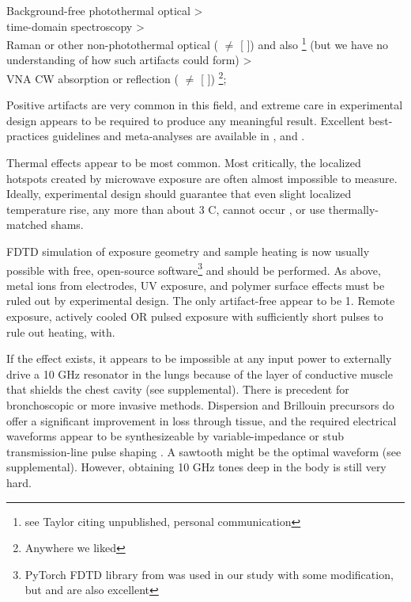 \documentclass[paper.tex]{subfiles}
\begin{document}
Background-free photothermal optical \cite{Microwave1993a}\cite{Broadband1988} >\\ time-domain spectroscopy\cite{Time2003}\cite{Dielectric2004}\cite{Microwave1994} >\\ Raman or other non-photothermal optical (\cite{optical1983} $\neq$ [\cite{Resonances1987} \cite{Dielectric1989}]) and also \footnote{see Taylor \cite{mechanisms1981} citing unpublished, personal communication} (but we have no understanding of how such artifacts could form) >\\ VNA CW absorption or reflection (\cite{Microwave1982} $\neq$ [\cite{Resonances1987} \cite{Dielectric1989}]) \cite{Substitution1982} \cite{Millimeter1980} \footnote{Anywhere we liked};

Positive artifacts are very common in this field, and extreme care in experimental design appears to be required to produce any meaningful result. Excellent best-practices guidelines and meta-analyses are available in \cite{Biological2016} \cite{Comprehensive2018} \cite{Funding2019}, \cite{chou1996radio} and \cite{Effects2016}.

Thermal effects appear to be most common. Most critically, the localized hotspots created by microwave exposure are often almost impossible to measure. Ideally, experimental design should guarantee that even slight localized temperature rise, any more than about 3 C, cannot occur \cite{Sharp1983}\cite{DNA2004}, or use thermally-matched shams\cite{Basic1983}. \cite{Effects1951}

FDTD simulation of exposure geometry and sample heating is now usually possible with free, open-source software\footnote{PyTorch FDTD library from \cite{Highly2019} was used in our study with some modification, but \cite{CUDAbased2019} and \cite{openEMS} are also excellent} and should be performed. As above, metal ions from electrodes, UV exposure, and polymer surface effects\cite{Effect1994a} must be ruled out by experimental design. The only artifact-free appear to be 1. Remote exposure, actively cooled OR pulsed exposure with sufficiently short pulses to rule out heating, with. 

If the effect exists, it appears to be impossible at any input power to externally drive a 10 GHz resonator in the lungs because of the layer of conductive muscle that shields the chest cavity (see supplemental). There is precedent for bronchoscopic \cite{Flexible2019}\cite{Antenna2018} or more invasive methods. Dispersion and Brillouin precursors do offer a significant improvement in loss through tissue, and the required electrical waveforms appear to be synthesizeable by variable-impedance or stub transmission-line pulse shaping\cite{Arbitrarya} . A sawtooth might be the optimal waveform (see supplemental). However, obtaining 10 GHz tones deep in the body is still very hard.
\end{document}
